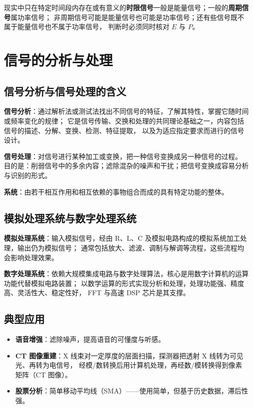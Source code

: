 现实中只在特定时间段内存在或有意义的\textbf{时限信号}一般是能量信号；一般的\textbf{周期信号}属功率信号；
非周期信号可能是能量信号也可能是功率信号；还有些信号既不属于能量信号也不属于功率信号，
判断时必须同时核对 $E$ 与 $P$。

\section{信号的分析与处理}

\subsection{信号分析与信号处理的含义}

\textbf{信号分析}：通过解析法或测试法找出不同信号的特征，了解其特性，掌握它随时间或频率变化的规律；
它是信号传输、交换和处理的共同理论基础之一，内容包括信号的描述、分解、变换、检测、特征提取，
以及为适应指定要求而进行的信号设计。

\textbf{信号处理}：对信号进行某种加工或变换，把一种信号变换成另一种信号的过程。
目的是：削弱信号中的多余内容；滤除混杂的噪声和干扰；把信号变换成容易分析与识别的形式。

\textbf{系统}：由若干相互作用和相互依赖的事物组合而成的具有特定功能的整体。

\subsection{模拟处理系统与数字处理系统}

\textbf{模拟处理系统}：输入模拟信号，经由 R、L、C 及模拟电路构成的模拟系统加工处理，输出仍为模拟信号；
通常包括放大、滤波、调制与解调等流程，这些流程均会影响处理效果。

\textbf{数字处理系统}：依赖大规模集成电路与数字处理算法，核心是用数字计算机的运算功能代替模拟电路装置；
以数学运算的形式实现分析和处理，处理功能强、精度高、灵活性大、稳定性好，
FFT 与高速 DSP 芯片是其支撑。

\subsection{典型应用}

\begin{itemize}
\item \textbf{语音增强}：滤除噪声，提高语音的可懂度与听感。
\item \textbf{CT 图像重建}：X 线束对一定厚度的层面扫描，探测器把透射 X 线转为可见光、再转为电信号，
  经模/数转换后用计算机处理，再经数/模转换得到像素矩阵（CT 图像）。
\item \textbf{股票分析}：简单移动平均线（SMA）——使用简单，但基于历史数据，滞后性强。
\end{itemize}

